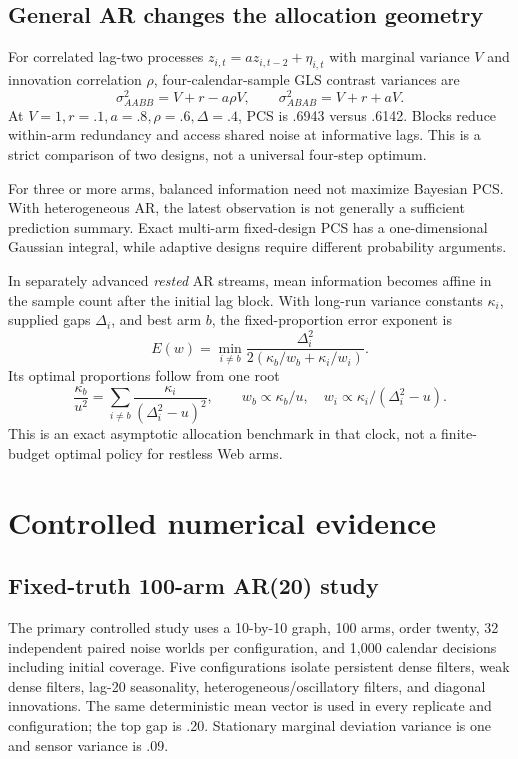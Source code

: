 \subsection{General AR changes the allocation geometry}
For correlated lag-two processes $z_{i,t}=az_{i,t-2}+\eta_{i,t}$ with marginal variance $V$ and innovation correlation $\rho$, four-calendar-sample GLS contrast variances are
\begin{equation}
\sigma^2_{AABB}=V+r-a\rho V,\qquad
\sigma^2_{ABAB}=V+r+aV.
\end{equation}
At $V=1,r=.1,a=.8,\rho=.6,\Delta=.4$, PCS is .6943 versus .6142. Blocks reduce within-arm redundancy and access shared noise at informative lags. This is a strict comparison of two designs, not a universal four-step optimum.

For three or more arms, balanced information need not maximize Bayesian PCS. With heterogeneous AR, the latest observation is not generally a sufficient prediction summary. Exact multi-arm fixed-design PCS has a one-dimensional Gaussian integral, while adaptive designs require different probability arguments.

In separately advanced \emph{rested} AR streams, mean information becomes affine in the sample count after the initial lag block. With long-run variance constants $\kappa_i$, supplied gaps $\Delta_i$, and best arm $b$, the fixed-proportion error exponent is
\begin{equation}
E(w)=\min_{i\ne b}\frac{\Delta_i^2}{2(\kappa_b/w_b+\kappa_i/w_i)}.
\end{equation}
Its optimal proportions follow from one root
\begin{equation}
\frac{\kappa_b}{u^2}=\sum_{i\ne b}\frac{\kappa_i}{(\Delta_i^2-u)^2},\qquad
w_b\propto\kappa_b/u,\quad w_i\propto\kappa_i/(\Delta_i^2-u).
\end{equation}
This is an exact asymptotic allocation benchmark in that clock, not a finite-budget optimal policy for restless Web arms.

\section{Controlled numerical evidence}

\subsection{Fixed-truth 100-arm AR(20) study}
The primary controlled study uses a 10-by-10 graph, 100 arms, order twenty, 32 independent paired noise worlds per configuration, and 1,000 calendar decisions including initial coverage. Five configurations isolate persistent dense filters, weak dense filters, lag-20 seasonality, heterogeneous/oscillatory filters, and diagonal innovations. The same deterministic mean vector is used in every replicate and configuration; the top gap is .20. Stationary marginal deviation variance is one and sensor variance is .09.

